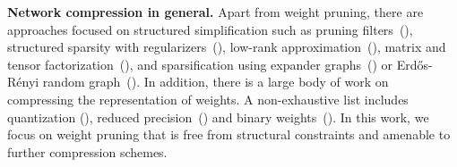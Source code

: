 \textbf{Network compression in general.}\quad
Apart from weight pruning, there are approaches focused on structured simplification such as pruning filters~(\cite{li2016pruning, molchanov2016pruning}), structured sparsity with regularizers~(\cite{wen2016learning}), low-rank approximation~(\cite{jaderberg2014speeding}), matrix and tensor factorization~(\cite{novikov2015tensorizing}), and sparsification using expander graphs~(\cite{prabhu2017deep}) or Erd\H{o}s-R\'{e}nyi random graph~(\cite{mocanu2018scalable}).
In addition, there is a large body of work on compressing the representation of weights.
A non-exhaustive list includes quantization (\cite{gong2014compressing}), reduced precision~(\cite{gupta2015deep}) and binary weights~(\cite{Hubara2016binarized}).
In this work, we focus on weight pruning that is free from structural constraints and amenable to further compression schemes.




